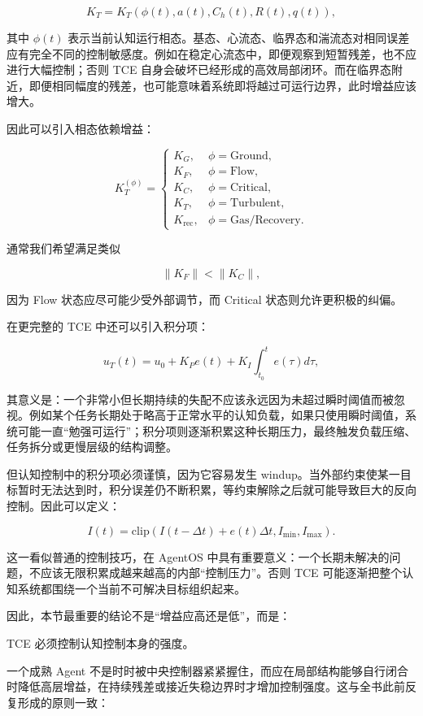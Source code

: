 \[
K_T
=
K_T
\left(
\phi(t),
a(t),
C_h(t),
R(t),
q(t)
\right),
\]

其中 $\phi(t)$ 表示当前认知运行相态。基态、心流态、临界态和湍流态对相同误差应有完全不同的控制敏感度。例如在稳定心流态中，即便观察到短暂残差，也不应进行大幅控制；否则 TCE 自身会破坏已经形成的高效局部闭环。而在临界态附近，即便相同幅度的残差，也可能意味着系统即将越过可运行边界，此时增益应该增大。

因此可以引入相态依赖增益：

\[
K_T^{(\phi)}
=
\begin{cases}
K_G, & \phi=\mathrm{Ground},\\
K_F, & \phi=\mathrm{Flow},\\
K_C, & \phi=\mathrm{Critical},\\
K_T, & \phi=\mathrm{Turbulent},\\
K_{\mathrm{rec}}, & \phi=\mathrm{Gas/Recovery}.
\end{cases}
\]

通常我们希望满足类似

\[
\|K_F\|
<
\|K_C\|,
\]

因为 Flow 状态应尽可能少受外部调节，而 Critical 状态则允许更积极的纠偏。

在更完整的 TCE 中还可以引入积分项：

\[
u_T(t)
=
u_0+
K_Pe(t)
+
K_I\int_{t_0}^{t}e(\tau)d\tau,
\]

其意义是：一个非常小但长期持续的失配不应该永远因为未超过瞬时阈值而被忽视。例如某个任务长期处于略高于正常水平的认知负载，如果只使用瞬时阈值，系统可能一直“勉强可运行”；积分项则逐渐积累这种长期压力，最终触发负载压缩、任务拆分或更慢层级的结构调整。

但认知控制中的积分项必须谨慎，因为它容易发生 windup。当外部约束使某一目标暂时无法达到时，积分误差仍不断积累，等约束解除之后就可能导致巨大的反向控制。因此可以定义：

\[
I(t)
=
\mathrm{clip}
\left(
I(t-\Delta t)+e(t)\Delta t,
I_{\min},
I_{\max}
\right).
\]

这一看似普通的控制技巧，在 AgentOS 中具有重要意义：一个长期未解决的问题，不应该无限积累成越来越高的内部“控制压力”。否则 TCE 可能逐渐把整个认知系统都围绕一个当前不可解决目标组织起来。

因此，本节最重要的结论不是“增益应高还是低”，而是：

\begin{conclusion}
TCE 必须控制认知控制本身的强度。
\end{conclusion}

一个成熟 Agent 不是时时被中央控制器紧紧握住，而应在局部结构能够自行闭合时降低高层增益，在持续残差或接近失稳边界时才增加控制强度。这与全书此前反复形成的原则一致：

